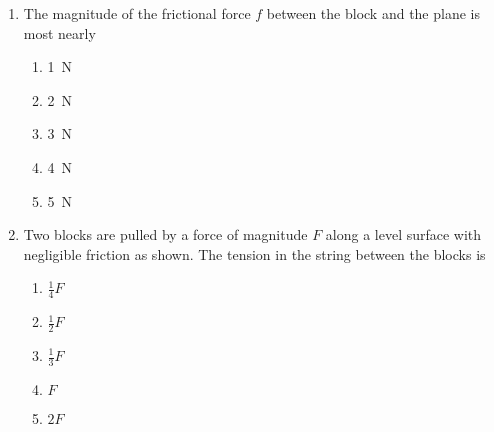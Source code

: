 \documentclass{../../oss-apphys}
\begin{document}
\begin{multicols}{2}
\begin{enumerate}[resume,leftmargin=18pt]
  \item The magnitude of the frictional force $f$ between the block and the
    plane is most nearly
    \begin{enumerate}[noitemsep,topsep=0pt,leftmargin=18pt,label=(\Alph*)]
    \item\SI{1}{\newton}
    \item\SI{2}{\newton}
    \item\SI{3}{\newton}
    \item\SI{4}{\newton}
    \item\SI{5}{\newton}
    \end{enumerate}
    \columnbreak
    

  \item Two blocks are pulled by a force of magnitude $F$ along a level surface
    with negligible friction as shown. The tension in the string between the
    blocks is
    \begin{center}
      \vspace{-.1in}
    \end{center}
    \begin{enumerate}[noitemsep,topsep=0pt,leftmargin=18pt,label=(\Alph*)]
    \item $\displaystyle\frac{1}{4}F$
    \item $\displaystyle\frac{1}{2}F$
    \item $\displaystyle\frac{1}{3}F$
    \item $F$
    \item $2F$
    \end{enumerate}
    

\end{enumerate}
\end{multicols}
\end{document}
